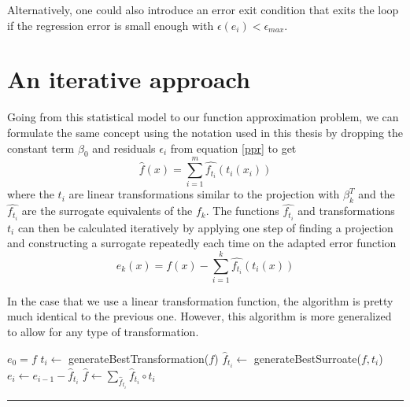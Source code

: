 \documentclass[
  a4paper,  %
  twoside,  %
  bibliography=totoc,
  headsepline,
  cleardoublepage=empty,
  parskip=half,
  draft=false
]{scrbook}
\newcommand{\delimit}{{\color{charcoal}\noindent\rule{\textwidth}{1pt}}}
\begin{document}
Alternatively, one could also introduce an error exit condition that exits the loop if the regression error is small enough with $\epsilon(e_i) < \epsilon_{max}$.

\section{An iterative approach}

Going from this statistical model to our function approximation problem, we can formulate the same concept using the notation used in this thesis by dropping the constant term $\beta_0$ and residuals $\epsilon_i$ from equation \ref{ppr} to get
\begin{equation}
\hat{f}(x)=\sum_{i=1}^m \hat{f_{t_i}}(t_i(x_i))
\end{equation}
where the $t_i$ are linear transformations similar to the projection with $\beta_k^T$ and the $\hat{f_{t_i}}$ are the surrogate equivalents of the $f_k$.
The functions $\hat{f_{t_i}}$ and transformations $t_i$ can then be calculated iteratively by applying one step of finding a projection and constructing a surrogate repeatedly each time on the adapted error function
\begin{equation}
e_k(x)=f(x) - \sum_{i=1}^k \hat{f_{t_i}}(t_i(x))
\end{equation}

In the case that we use a linear transformation function, the algorithm is pretty much identical to the previous one.
However, this algorithm is more generalized to allow for any type of transformation.

\newpage
\begin{mdframed}[style=algstyle,frametitle={\textbf{function} \texttt{transformedSurrogateSum}{$(f, i_{\text{max}})$}}]
\normalsize
\vspace{5.5mm}
\begin{algorithmic}[1]
    \State $e_0 = f$
    	\State $t_i \gets$ generateBestTransformation($f$)
    	\State $\hat{f}_{t_i} \gets$ generateBestSurroate($f, t_i$)
    	\State $e_i \gets e_{i - 1} - \hat{f}_{t_i}$
    \EndFor
    \State $\hat{f} \gets \sum_{\hat{f}_{t_i}} \hat{f}_{t_i} \circ t_i$
    \State {}
\end{algorithmic}
\vspace{-1.5mm}
\delimit
	\label{alg:itappr}
\end{mdframed}
\end{document}
